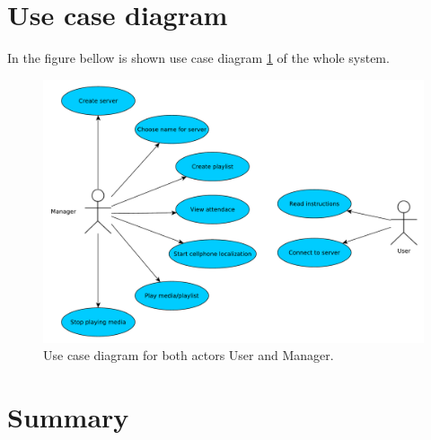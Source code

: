 \section{Use case diagram}
In the figure bellow is shown use case diagram \ref{img:usecase} of the whole system.

\begin{figure}[h]
    \begin{center}
    \includegraphics[scale=0.4]{images/usecase.pdf}
    \caption{Use case diagram for both actors User and Manager.}
    \label{img:usecase}
    \end{center}
\end{figure}

%	
%		

\section{Summary}
